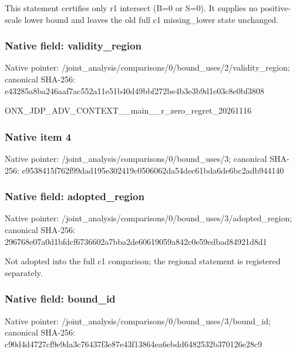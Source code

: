 \documentclass[10pt,a4paper]{article}
\begin{document}
\begingroup\raggedright\sloppy This statement certifies only r1 intersect (B=\allowbreak{}0 or S=\allowbreak{}0). It supplies no positive-scale lower bound and leaves the old full c1 missing\_\allowbreak{}lower state unchanged.\par\endgroup

\subsubsection{Native field: validity\_\allowbreak{}region}
Native pointer: /joint\_\allowbreak{}analysis/comparisons/0/bound\_\allowbreak{}uses/2/validity\_\allowbreak{}region; canonical SHA-256: e43285a8ba246aaf7ac552a11e51b40d49bbf272be4b3e3b9d1e03c8e0bf3808

\begingroup\raggedright\sloppy ONX\_\allowbreak{}JDP\_\allowbreak{}ADV\_\allowbreak{}CONTEXT\_\allowbreak{}\_\allowbreak{}main\_\allowbreak{}\_\allowbreak{}r\_\allowbreak{}zero\_\allowbreak{}regret\_\allowbreak{}20261116\par\endgroup

\subsubsection{Native item 4}
Native pointer: /joint\_\allowbreak{}analysis/comparisons/0/bound\_\allowbreak{}uses/3; canonical SHA-256: e9538415f762f99dad195e302419c0506062da54dec61bda6de6bc2adb944140

\subsubsection{Native field: adopted\_\allowbreak{}region}
Native pointer: /joint\_\allowbreak{}analysis/comparisons/0/bound\_\allowbreak{}uses/3/adopted\_\allowbreak{}region; canonical SHA-256: 296768e07a0d1bfdcf6736602a7bba2de60619059a842c0e59edbad84921d8d1

\begingroup\raggedright\sloppy Not adopted into the full c1 comparison;\allowbreak{} the regional statement is registered separately.\par\endgroup

\subsubsection{Native field: bound\_\allowbreak{}id}
Native pointer: /joint\_\allowbreak{}analysis/comparisons/0/bound\_\allowbreak{}uses/3/bound\_\allowbreak{}id; canonical SHA-256: c90d4d4727cf9e9da3c76437f3e87e43f13864ea6ebdd6482532b370126e28c9
\end{document}

